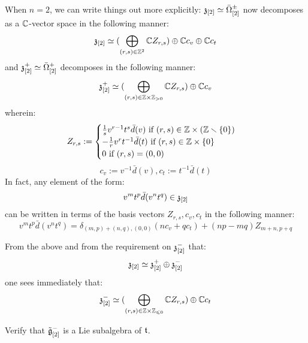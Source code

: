 \begin{remark}
                When $n = 2$, we can write things out more explicitly: $\mathfrak{z}_{[2]} \simeq \bar{\Omega}_{[2]}^{\pm}$ now decomposes as a $\mathbb{C}$-vector space in the following manner:
                    $$\mathfrak{z}_{[2]} \simeq ( \bigoplus_{(r, s) \in \mathbb{Z}^2} \mathbb{C} Z_{r, s}) \oplus \mathbb{C} c_v \oplus \mathbb{C} c_t$$
                and $\mathfrak{z}_{[2]}^+ \simeq \bar{\Omega}_{[2]}^+$ decomposes in the following manner:
                    $$\z_{[2]}^+ \cong ( \bigoplus_{(r, s) \in \Z \x \Z_{> 0}} \bbC Z_{r, s}) \oplus \bbC c_v$$
                wherein:
                    $$
                        Z_{r, s} :=
                        \begin{cases}
                            \text{$\frac1s v^{r - 1} t^s \bar{d}(v)$ if $(r, s) \in \Z \x (\Z \setminus \{0\})$}
                            \\
                            \text{$-\frac1r v^r t^{-1} \bar{d}(t)$ if $(r, s) \in \Z \x \{0\}$}
                            \\
                            \text{$0$ if $(r, s) = (0, 0)$}
                        \end{cases}
                    $$
                    $$c_v := v^{-1} \bar{d}(v), c_t := t^{-1} \bar{d}(t)$$
                In fact, any element of the form:
                    $$v^m t^p \bar{d}(v^n t^q) \in \mathfrak{z}_{[2]}$$
                can be written in terms of the basis vectors $Z_{r, s}, c_v, c_t$ in the following manner:
                    $$v^m t^p \bar{d}(v^n t^q) = \delta_{(m, p) + (n, q), (0, 0)} ( n c_v + q c_t ) + (np - mq) Z_{m + n, p + q}$$

                From the above and from the requirement on $\mathfrak{z}_{[2]}^-$ that:
                    $$\mathfrak{z}_{[2]} \simeq \mathfrak{z}_{[2]}^+ \oplus \mathfrak{z}_{[2]}^-$$
                one sees immediately that:
                    $$\z_{[2]}^- \cong ( \bigoplus_{(r, s) \in \Z \x \Z_{\leq 0}} \bbC Z_{r, s}) \oplus \bbC c_t$$
            \end{remark}
            \begin{question} \label{question: toroidal_dual}
                Verify that $\tilde{\mathfrak{g}}_{[2]}^-$ is a Lie subalgebra of $\mathfrak{t}$.
            \end{question}
